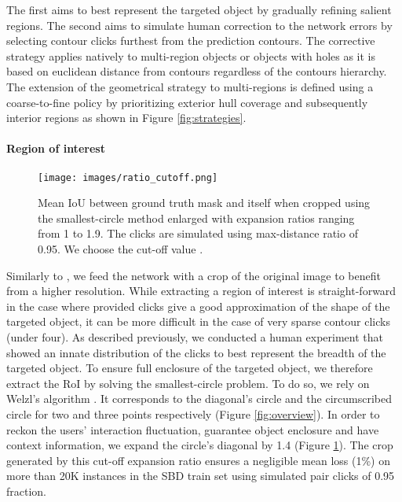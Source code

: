 \documentclass[letterpaper, 10 pt, conference]{ieeeconf}
\begin{document}
The first aims to best represent the targeted object by gradually refining salient regions. The second aims to simulate human correction to the network errors by selecting contour clicks furthest from the prediction contours. The corrective strategy applies natively to multi-region objects or objects with holes as it is based on euclidean distance from contours regardless of the contours hierarchy. The extension of the geometrical strategy to multi-regions is defined using a coarse-to-fine policy by prioritizing exterior hull coverage and subsequently interior regions as shown in Figure \ref{fig:strategies}.


\paragraph{Region of interest}

\begin{figure}
    \centering
    \texttt{[image: images/ratio\_cutoff.png]}
    \caption{Mean IoU between ground truth mask and itself when cropped using the smallest-circle method enlarged with expansion ratios ranging from 1 to 1.9. The  clicks are simulated using max-distance ratio of 0.95. We choose the cut-off value .}
    \label{fig:cutoff}
\end{figure}

Similarly to \cite{mahadevan18}, we feed the network with a crop of the original image to benefit from a higher resolution. While extracting a region of interest is straight-forward in the case where provided clicks give a good approximation of the shape of the targeted object, it can be more difficult in the case of very sparse contour clicks (under four). As described previously, we conducted a human experiment that showed an innate distribution of the clicks to best represent the breadth of the targeted object. To ensure full enclosure of the targeted object, we therefore extract the RoI by solving the smallest-circle problem. To do so, we rely on Welzl’s algorithm \cite{welzl91}. It corresponds to the diagonal's circle and the circumscribed circle for two and three points respectively (Figure \ref{fig:overview}). In order to reckon the users' interaction fluctuation, guarantee object enclosure and have context information, we expand the circle's diagonal by 1.4 (Figure \ref{fig:cutoff}). The crop generated by this cut-off expansion ratio ensures a negligible mean loss (1\%) on more than 20K instances in the SBD train set \cite{bharath11} using simulated pair clicks of 0.95 fraction.
\end{document}
